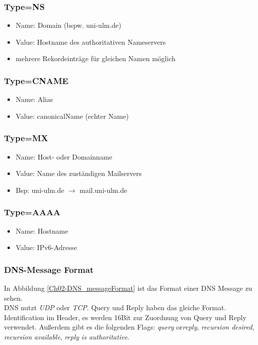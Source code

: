 \subsubsection{Type=NS}
\begin{itemize}
    \item Name: Domain (bspw. uni-ulm.de)
    \item Value: Hostname des authoritativen Nameservers
    \item mehrere Rekordeinträge für gleichen Namen möglich
\end{itemize}

\subsubsection{Type=CNAME}
\begin{itemize}
    \item Name: Alias
    \item Value: \glqq canonical\grqq Name (echter Name)
\end{itemize}

\subsubsection{Type=MX}
\begin{itemize}
    \item Name: Host- oder Domainname
    \item Value: Name des zuständigen Mailservers
    \item Bsp: uni-ulm.de $\rightarrow$ mail.uni-ulm.de
\end{itemize}

\subsubsection{Type=AAAA}
\begin{itemize}
    \item Name: Hostname
    \item Value: IPv6-Adresse 
\end{itemize}

\subsubsection{DNS-Message Format}
In Abbildung \ref{Ch02-DNS_messageFormat} ist das Format einer DNS Message zu sehen.\\
\noindent DNS nutzt \emph{UDP} oder \emph{TCP}. Query und Reply haben das gleiche Format.\\
\noindent Identification im Header, es werden 16Bit zur Zuordnung von Query und Reply verwendet. Außerdem gibt es die folgenden Flags: \textit{query} or\textit{reply}, \textit{recursion desired}, \textit{recursion available}, \textit{reply is authoritative}.


